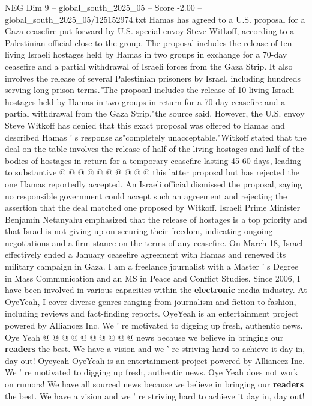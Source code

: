 \begin{textsample}{NEG Dim 9 – global\_south\_2025\_05 – Score -2.00 – global\_south\_2025\_05/125152974.txt}  \label{ex:f9_neg_248}
Hamas has agreed to a U.S. proposal for a Gaza ceasefire put forward by U.S. special envoy Steve Witkoff, according to a Palestinian official close to the group.
The proposal includes the release of ten living Israeli hostages held by Hamas in two groups in exchange for a 70-day ceasefire and a partial withdrawal of Israeli forces from the Gaza Strip.
It also involves the release of several Palestinian prisoners by Israel, including hundreds serving long prison terms."The proposal includes the release of 10 living Israeli hostages held by Hamas in two groups in return for a 70-day ceasefire and a partial withdrawal from the Gaza Strip,"the source said.
However, the U.S. envoy Steve Witkoff has denied that this exact proposal was offered to Hamas and described Hamas ' s response as"completely unacceptable."Witkoff stated that the deal on the table involves the release of half of the living hostages and half of the bodies of hostages in return for a temporary ceasefire lasting 45-60 days, leading to substantive @ @ @ @ @ @ @ @ @ @ this latter proposal but has rejected the one Hamas reportedly accepted.
An Israeli official dismissed the proposal, saying no responsible government could accept such an agreement and rejecting the assertion that the deal matched one proposed by Witkoff.
Israeli Prime Minister Benjamin Netanyahu emphasized that the release of hostages is a top priority and that Israel is not giving up on securing their freedom, indicating ongoing negotiations and a firm stance on the terms of any ceasefire.
On March 18, Israel effectively ended a January ceasefire agreement with Hamas and renewed its military campaign in Gaza.
I am a freelance journalist with a Master ' s Degree in Mass Communication and an MS in Peace and Conflict Studies.
Since 2006, I have been involved in various capacities within the \textbf{electronic} media industry.
At OyeYeah, I cover diverse genres ranging from journalism and fiction to fashion, including reviews and fact-finding reports.
OyeYeah is an entertainment project powered by Alliancez Inc.
We ' re motivated to digging up fresh, authentic news.
Oye Yeah @ @ @ @ @ @ @ @ @ @ news because we believe in bringing our \textbf{readers} the best.
We have a vision and we ' re striving hard to achieve it day in, day out!
Oyeyeah OyeYeah is an entertainment project powered by Alliancez Inc.
We ' re motivated to digging up fresh, authentic news.
Oye Yeah does not work on rumors!
We have all sourced news because we believe in bringing our \textbf{readers} the best.
We have a vision and we ' re striving hard to achieve it day in, day out!

\end{textsample}
